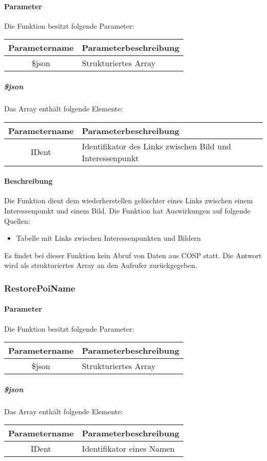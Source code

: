 \paragraph{Parameter} Die Funktion besitzt folgende Parameter:
\begin{table}[H]
	\begin{tabular}{|c|p{11cm}|}
		\hline
		\textbf{Parametername} & \textbf{Parameterbeschreibung} \\ \hline
		\$json & Strukturiertes Array \\ \hline
	\end{tabular}
\end{table}
\subparagraph{\$json}Das Array enthält folgende Elemente:
\begin{table}[H]
	\begin{tabular}{|c|p{11cm}|}
		\hline
		\textbf{Parametername} & \textbf{Parameterbeschreibung} \\ \hline
		IDent & Identifikator des Links zwischen Bild und Interessenpunkt \\ \hline
	\end{tabular}
\end{table}
\paragraph{Beschreibung} Die Funktion dient dem wiederherstellen gelöschter eines Links zwischen einem Interessenpunkt und einem Bild. Die Funktion hat Auswirkungen auf folgende Quellen:
\begin{itemize}
	\item Tabelle mit Links zwischen Interessenpunkten und Bildern
\end{itemize}
Es findet bei dieser Funktion kein Abruf von Daten aus {\glqq COSP\grqq} statt. Die Antwort wird als strukturiertes Array an den Aufrufer zurückgegeben.
\subsubsection{RestorePoiName}
\paragraph{Parameter} Die Funktion besitzt folgende Parameter:
\begin{table}[H]
	\begin{tabular}{|c|p{11cm}|}
		\hline
		\textbf{Parametername} & \textbf{Parameterbeschreibung} \\ \hline
		\$json & Strukturiertes Array \\ \hline
	\end{tabular}
\end{table}
\subparagraph{\$json}Das Array enthält folgende Elemente:
\begin{table}[H]
	\begin{tabular}{|c|p{11cm}|}
		\hline
		\textbf{Parametername} & \textbf{Parameterbeschreibung} \\ \hline
		IDent & Identifikator eines Namen \\ \hline
	\end{tabular}
\end{table}
